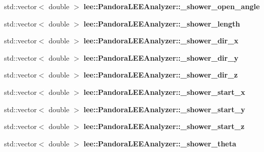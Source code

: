 \begin{DoxyCompactItemize}
\item 
\hypertarget{group__lee_ga9e637e1f18334830d94136b89c4d0138}{std\-::vector$<$ double $>$ {\bfseries lee\-::\-Pandora\-L\-E\-E\-Analyzer\-::\-\_\-shower\-\_\-open\-\_\-angle}}\label{group__lee_ga9e637e1f18334830d94136b89c4d0138}

\item 
\hypertarget{group__lee_ga88255d9d3a3a401c834d624076c30d5b}{std\-::vector$<$ double $>$ {\bfseries lee\-::\-Pandora\-L\-E\-E\-Analyzer\-::\-\_\-shower\-\_\-length}}\label{group__lee_ga88255d9d3a3a401c834d624076c30d5b}

\item 
\hypertarget{group__lee_gaac6afc45d77fbbfb38addc97038e1893}{std\-::vector$<$ double $>$ {\bfseries lee\-::\-Pandora\-L\-E\-E\-Analyzer\-::\-\_\-shower\-\_\-dir\-\_\-x}}\label{group__lee_gaac6afc45d77fbbfb38addc97038e1893}

\item 
\hypertarget{group__lee_gaa08672578dd6c1729649fa54a1725401}{std\-::vector$<$ double $>$ {\bfseries lee\-::\-Pandora\-L\-E\-E\-Analyzer\-::\-\_\-shower\-\_\-dir\-\_\-y}}\label{group__lee_gaa08672578dd6c1729649fa54a1725401}

\item 
\hypertarget{group__lee_gaee2bf39916f97db6bee077df4020662f}{std\-::vector$<$ double $>$ {\bfseries lee\-::\-Pandora\-L\-E\-E\-Analyzer\-::\-\_\-shower\-\_\-dir\-\_\-z}}\label{group__lee_gaee2bf39916f97db6bee077df4020662f}

\item 
\hypertarget{group__lee_ga8d3d2b24d81dc924d1f972bf3748dd76}{std\-::vector$<$ double $>$ {\bfseries lee\-::\-Pandora\-L\-E\-E\-Analyzer\-::\-\_\-shower\-\_\-start\-\_\-x}}\label{group__lee_ga8d3d2b24d81dc924d1f972bf3748dd76}

\item 
\hypertarget{group__lee_gae12d2a6c7e2d78fc9d7e6f30ce959fa7}{std\-::vector$<$ double $>$ {\bfseries lee\-::\-Pandora\-L\-E\-E\-Analyzer\-::\-\_\-shower\-\_\-start\-\_\-y}}\label{group__lee_gae12d2a6c7e2d78fc9d7e6f30ce959fa7}

\item 
\hypertarget{group__lee_gafef1c0810411173778fa2ea099cbb03f}{std\-::vector$<$ double $>$ {\bfseries lee\-::\-Pandora\-L\-E\-E\-Analyzer\-::\-\_\-shower\-\_\-start\-\_\-z}}\label{group__lee_gafef1c0810411173778fa2ea099cbb03f}

\item 
\hypertarget{group__lee_ga3ad8af27c4c242410ffe4c1e1407e3c0}{std\-::vector$<$ double $>$ {\bfseries lee\-::\-Pandora\-L\-E\-E\-Analyzer\-::\-\_\-shower\-\_\-theta}}\label{group__lee_ga3ad8af27c4c242410ffe4c1e1407e3c0}


\end{DoxyCompactItemize}
